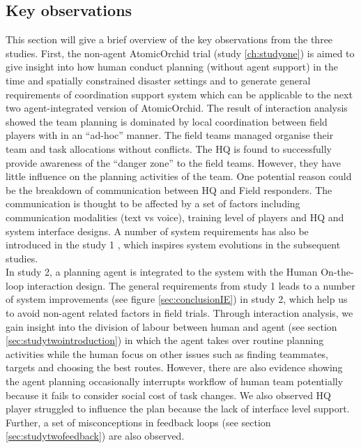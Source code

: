 \subsection{Key observations}\label{sec:conclustionOB}
This section will give a brief overview of the key observations from the three studies. First, the non-agent AtomicOrchid trial (study \ref{ch:studyone}) is aimed to give insight into how human conduct planning (without agent support) in the time and spatially constrained disaster settings and to generate general requirements of coordination support system which can be applicable to the next two agent-integrated version of AtomicOrchid. The result of interaction analysis showed the team planning is dominated by local coordination between field players with in an ``ad-hoc'' manner. The field teams managed organise their team and task allocations without conflicts. The HQ is found to successfully provide awareness of the ``danger zone'' to the field teams. However, they have little influence on the planning activities of the team. One potential reason could be the breakdown of communication between HQ and Field responders. The communication is thought to be affected by a set of factors including communication modalities (text vs voice), training level of players and HQ and system interface designs. A number of system requirements has also be introduced in the study 1 , which inspires system evolutions in the subsequent studies. \\


In study 2, a planning agent is integrated to the system with the Human On-the-loop interaction design. The general requirements from study 1 leads to a number of system improvements (see figure \ref{sec:conclusionIE}) in study 2, which help us to avoid non-agent related factors in field trials. Through interaction analysis, we gain insight into the division of labour between human and agent (see section \ref{sec:studytwointroduction}) in which the agent takes over routine planning activities while the human focus on other issues such as finding teammates, targets and choosing the best routes. However, there are also evidence showing the agent planning occasionally interrupts workflow of human team potentially because it fails to consider social cost of task changes. We also observed HQ player struggled to influence the plan because the lack of interface level support. Further, a set of misconceptions in feedback loops (see section \ref{sec:studytwofeedback}) are also observed.\\

